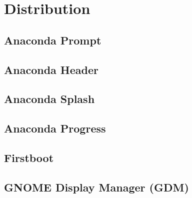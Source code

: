 \documentclass[12pt]{book}
\begin{document}
\part{Distribution}
   \hypertarget{par:Distribution}{}
   \label{par:Distribution}

\chapter{Anaconda Prompt}
   \hypertarget{cha:Distribution:Anaconda:Prompt}{}
   \label{cha:Distribution:Anaconda:Prompt}
   

\chapter{Anaconda Header}
   \hypertarget{cha:Distribution:Anaconda:Header}{}
   \label{cha:Distribution:Anaconda:Header}
   

\chapter{Anaconda Splash}
   \hypertarget{cha:Distribution:Anaconda:Splash}{}
   \label{cha:Distribution:Anaconda:Splash}
   

\chapter{Anaconda Progress}
   \hypertarget{cha:Distribution:Anaconda:Progress}{}
   \label{cha:Distribution:Anaconda:Progress}
   
   
   

\chapter{Firstboot}
   \hypertarget{cha:Distribution:Anaconda:Firstboot}{}
   \label{cha:Distribution:Anaconda:Firstboot}
   
   
   

\chapter{GNOME Display Manager (GDM)}
   \hypertarget{cha:Distribution:BootUp:GDM}{}
   \label{cha:Distribution:BootUp:GDM}
\end{document}
